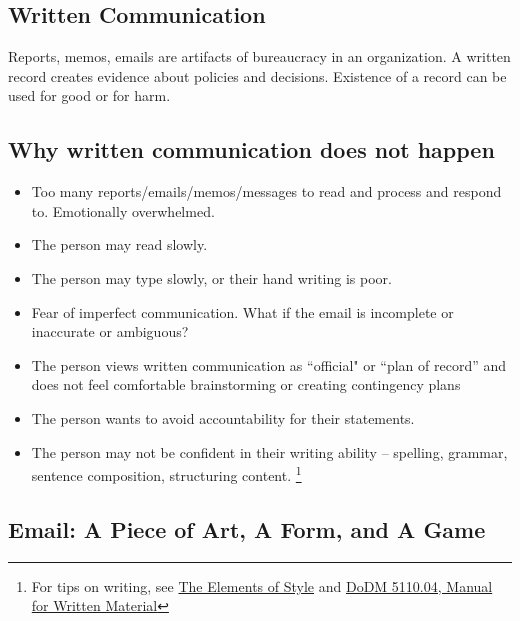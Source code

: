 \subsection*{Written Communication\label{sec:written-communication}}

Reports, memos, emails are artifacts of bureaucracy in an organization. A written record creates evidence about policies and decisions. Existence of a record can be used for good or for harm.







\subsection*{Why written communication does not happen\label{sec:written-comm-does-not-happen}}
\begin{itemize}
    \item Too many reports/emails/memos/messages to read and process and respond to. Emotionally overwhelmed.
\item The person may read slowly.
\item The person may type slowly, or their hand writing is poor.
\item Fear of imperfect communication. What if the email is incomplete or inaccurate or ambiguous?
\item The person views written communication as ``official" or ``plan of record'' and does not feel comfortable brainstorming or creating contingency plans
\item The person wants to avoid accountability for their statements.
\item The person may not be confident in their writing ability -- spelling, grammar, sentence composition, structuring content. \footnote{For tips on writing, see 
\href{https://en.wikipedia.org/wiki/The_Elements_of_Style}{The Elements of Style}
and
\href{https://www.google.com/search?q=dodm+5110.04}{DoDM 5110.04, Manual for Written Material}}
\end{itemize}




\subsection*{Email: A Piece of Art, A Form, and A Game\label{sec:art-form-game}}

